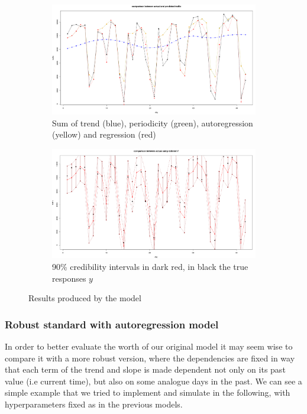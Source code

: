 \documentclass[11pt,twoside]{report}
\begin{document}
\begin{figure}[H]
	\begin{subfigure}[H]{1\linewidth}
		\centering
\includegraphics[width=135 mm]{pictures/m3_p1.png}
\caption{Sum of trend (blue), periodicity (green), autoregression (yellow) and regression (red)}
\label{fig:M3_p1}
	\end{subfigure}
	\vfill
	\begin{subfigure}[H]{1\linewidth}
		\centering
\includegraphics[width=135 mm]{pictures/m3_p2.png}
\caption{90\% credibility intervals in dark red, in black the true responses $ y $}
\label{fig:M3_p2}
	\end{subfigure}%
	\caption{Results produced by the model}
\end{figure}

\subsubsection{Robust standard with autoregression model}
In order to better evaluate the worth of our original model it may seem wise to compare it with a more robust version, where the dependencies are fixed in way that each term of the trend and slope is made dependent not only on its past value (i.e current time), but also on some analogue days in the past. We can see a simple example that we tried to implement and simulate in the following, with hyperparameters fixed as in the previous models.
\end{document}
